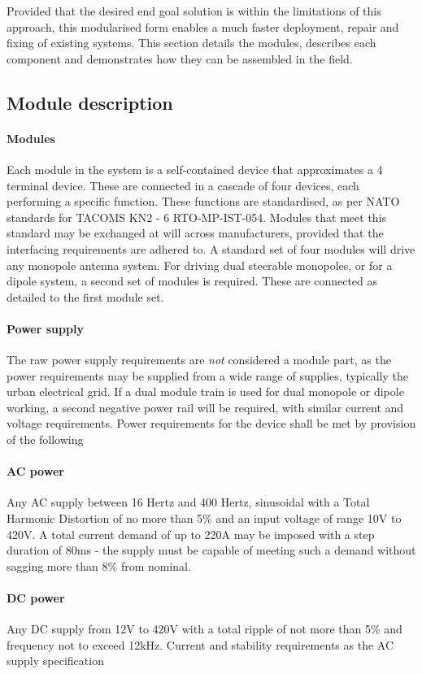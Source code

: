 \documentclass[review]{elsarticle}
\begin{document}
Provided that the desired end goal solution is within the limitations of this approach, this modularised form enables a much faster deployment, repair and fixing of existing systems. This section details the modules, describes each component and demonstrates how they can be assembled in the field.

\subsection{Module description} 
\paragraph{Modules}Each module in the system is a self-contained device that approximates a 4 terminal device. These are connected in a cascade of four devices, each performing a specific function. These functions are standardised, as per NATO standards for TACOMS KN2 - 6 RTO-MP-IST-054. Modules that meet this standard may be exchanged at will across manufacturers, provided that the interfacing requirements are adhered to.
A standard set of four modules will drive any monopole antenna system. For driving dual steerable monopoles, or for a dipole system, a second set of modules is required. These are connected as detailed to the first module set.
\paragraph{Power supply} The raw power supply requirements are \emph{not} considered a module part, as the power requirements may be supplied from a wide range of supplies, typically the urban electrical grid. If a dual module train is used for dual monopole or dipole working, a second negative power rail will be required, with similar current and voltage requirements.  Power requirements for the device shall be met by provision of the following
\paragraph{AC power} Any AC supply between 16 Hertz and 400 Hertz, sinusoidal with a Total Harmonic Distortion of no more than 5\% and an input voltage of range 10V to 420V. A total current demand of up to 220A may be imposed with a step duration of 80ms - the supply must be capable of meeting such a demand without sagging more than 8\% from nominal.
\paragraph{DC power} Any DC supply from 12V to 420V with a total ripple of not more than 5\% and frequency not to exceed 12kHz. Current and stability requirements as the AC supply specification
\end{document}
